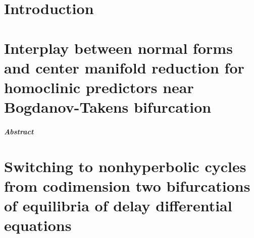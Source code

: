 \documentclass[twoside]{report}
\begin{document}
\newif\ifsiam
\siamfalse
\siamtrue

\newif\ifcompileimages%
\compileimagestrue%
\compileimagesfalse%



\newif\ifthesis
\thesistrue

{\hypersetup{linkcolor=siamblue} \tableofcontents }

\chapter{Introduction}


\chapter[BT normal forms and center manifold reduction]
        {Interplay between normal forms and center manifold reduction for homoclinic predictors near Bogdanov-Takens bifurcation}
\label{chapter:interplay}
\newcommand\imagesdir{./images/btinterplay}
\newcommand\datadir{./data/btinterplay}
\paragraph{{\color{header1}Abstract}}








\begin{subappendices}




\end{subappendices}

\renewcommand\tikzdir{tikz/switching}
\renewcommand\imagedir{images/switching}
\chapter[Switching to nonhyperbolic cycles in DDEs]
        {Switching to nonhyperbolic cycles from codimension two bifurcations of equilibria of delay differential equations}
\label{chapter:switching}

\end{document}
